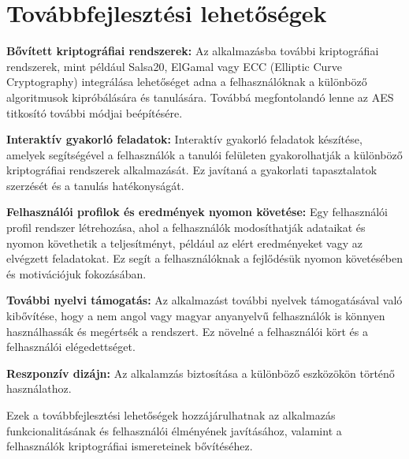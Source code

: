 \chapter{Továbbfejlesztési lehetőségek}


\textbf{Bővített kriptográfiai rendszerek:} Az alkalmazásba további kriptográfiai rendszerek, mint például Salsa20, ElGamal vagy ECC (Elliptic Curve Cryptography) integrálása lehetőséget adna a felhasználóknak a különböző algoritmusok kipróbálására és tanulására. Továbbá megfontolandó lenne az AES titkosító további módjai beépítésére.

\textbf{Interaktív gyakorló feladatok:} Interaktív gyakorló feladatok készítése, amelyek segítségével a felhasználók a tanulói felületen gyakorolhatják a különböző kriptográfiai rendszerek alkalmazását. Ez javítaná a gyakorlati tapasztalatok szerzését és a tanulás hatékonyságát.

\textbf{Felhasználói profilok és eredmények nyomon követése:} Egy felhasználói profil rendszer létrehozása, ahol a felhasználók modosíthatják adataikat és nyomon követhetik a teljesítményt, például az elért eredményeket vagy az elvégzett feladatokat. Ez segít a felhasználóknak a fejlődésük nyomon követésében és motivációjuk fokozásában.

\textbf{További nyelvi támogatás:} Az alkalmazást további nyelvek támogatásával való kibővítése, hogy a nem angol vagy magyar anyanyelvű felhasználók is könnyen használhassák és megértsék a rendszert. Ez növelné a felhasználói kört és a felhasználói elégedettséget.

\textbf{Reszponzív dizájn:} Az alkalamzás biztosítása a különböző eszközökön történő használathoz.

\vspace{10pt}
Ezek a továbbfejlesztési lehetőségek hozzájárulhatnak az alkalmazás funkcionalitásának és felhasználói élményének javításához, valamint a felhasználók kriptográfiai ismereteinek bővítéséhez.